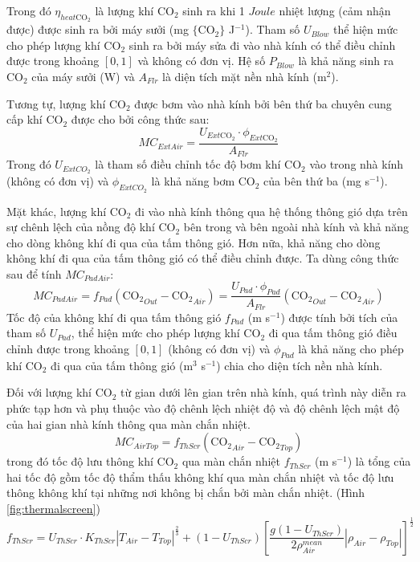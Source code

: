 \documentclass[a4paper]{article}
\begin{document}
Trong đó $\eta_{heat\mathrm{CO_2}}$ là lượng khí $\mathrm{CO_2}$ sinh ra khi 1 $Joule$ nhiệt lượng (cảm nhận được) được sinh ra bởi máy sưởi (mg $\{\mathrm{CO_2}\}$ J$^{-1}$). Tham số $U_{Blow}$ thể hiện mức cho phép lượng khí $\mathrm{CO_2}$ sinh ra bởi máy sửa đi vào nhà kính có thể điều chỉnh được trong khoảng $[0,1]$ và không có đơn vị. Hệ số $P_{Blow}$ là khả năng sinh ra $\mathrm{CO_2}$ của máy sưởi (W) và $A_{Flr}$ là diện tích mặt nền nhà kính (m$^2$).
\par
Tương tự, lượng khí $\mathrm{CO_2}$ được bơm vào nhà kính bởi bên thứ ba chuyên cung cấp khí $\mathrm{CO_2}$ được cho bởi công thức sau:
\begin{equation}\label{eq:4}
    MC_{ExtAir} = \dfrac{U_{Ext\mathrm{CO_2}}\cdot \phi_{Ext\mathrm{CO_2}}}{A_{Flr}}
\end{equation}
Trong đó $U_{ExtCO_2}$ là tham số điều chỉnh tốc độ bơm khí $\mathrm{CO_2}$ vào trong nhà kính (không có đơn vị) và  $\phi_{ExtCO_2}$ là khả năng bơm $\mathrm{CO_2}$ của bên thứ ba (mg s$^{-1}$).
\par
Mặt khác, lượng khí $\mathrm{CO_2}$ đi vào nhà kính thông qua hệ thống thông gió dựa trên sự chênh lệch của nồng độ khí $\mathrm{CO_2}$ bên trong và bên ngoài nhà kính và khả năng cho dòng không khí đi qua của tấm thông gió. Hơn nữa, khả năng cho dòng không khí đi qua của tấm thông gió có thể điều chỉnh được. Ta dùng công thức sau để tính $MC_{PadAir}$:
\begin{equation}\label{eq:5}
    MC_{PadAir} = f_{Pad}(\mathrm{CO_{2}}_{Out} - \mathrm{CO_{2}}_{Air}) = \dfrac{U_{Pad}\cdot \phi_{Pad}}{A_{Flr}}(\mathrm{CO_{2}}_{Out} - \mathrm{CO_{2}}_{Air})
\end{equation}
Tốc độ của không khí đi qua tấm thông gió $f_{Pad}$ (m s$^{-1}$) được tính bởi tích của tham số $U_{Pad}$, thể hiện mức cho phép lượng khí $\mathrm{CO_2}$ đi qua tấm thông gió điều chỉnh được trong khoảng $[0,1]$ (không có đơn vị) và $\phi_{Pad}$ là khả năng cho phép khí $\mathrm{CO_2}$ đi qua của tấm thông gió (m$^3$ s$^{-1}$) chia cho diện tích nền nhà kính. 
\par
Đối với lượng khí $\mathrm{CO_2}$ từ gian dưới lên gian trên nhà kính, quá trình này diễn ra phức tạp hơn và phụ thuộc vào độ chênh lệch nhiệt độ và độ chênh lệch mật độ của hai gian nhà kính thông qua màn chắn nhiệt. 
\begin{equation}\label{eq:6}
    MC_{AirTop} = f_{ThScr}(\mathrm{CO_{2}}_{Air} - \mathrm{CO_{2}}_{Top})
\end{equation}
trong đó tốc độ lưu thông khí $\mathrm{CO_2}$ qua màn chắn nhiệt $f_{ThScr}$ (m s$^{-1}$) là tổng của hai tốc độ gồm tốc độ thẩm thấu không khí qua màn chắn nhiệt và tốc độ lưu thông không khí tại những nơi không bị chắn bởi màn chắn nhiệt. (Hình \ref{fig:thermalscreen})
\begin{equation}\label{eq:7}
    f_{ThScr} = U_{ThScr}\cdot K_{ThScr} |T_{Air} - T_{Top}|^{\frac{2}{3}} + (1 - U_{ThScr})
    \left[ \dfrac{g(1 - U_{ThScr})}{2\rho^{mean}_{Air}} |\rho_{Air} - \rho_{Top}|\right]^{\frac{1}{2}}
\end{equation}
\end{document}
